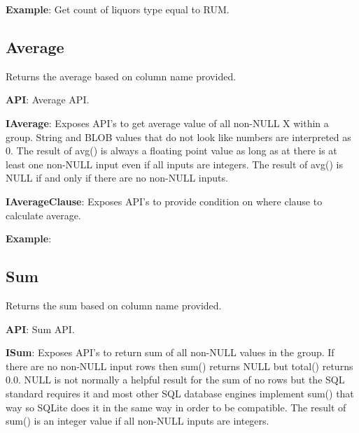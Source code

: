 			\textbf{Example}: Get count of liquors type equal to RUM.
				


	\subsection{Average} 
		\par 
		Returns the average based on column name provided.

			\textbf{API}: Average API.
				
		
			\textbf{IAverage}:  Exposes API's to get average value of all non-NULL X within a group. 
 						 String and BLOB values that do not look like numbers are interpreted as 0.
						 The result of avg() is always a floating point value as long as at there is at least one non-NULL input even if all inputs are integers.
						 The result of avg() is NULL if and only if there are no non-NULL inputs.

				

			
			\textbf{IAverageClause}: Exposes API's to provide condition on where clause to calculate average.
				

			\textbf{Example}: 
				
		

	\subsection{Sum} 
		\par 
		Returns the sum based on column name provided.

			\textbf{API}: Sum API.
				
		
			\textbf{ISum}:   Exposes API's to return sum of all non-NULL values in the group.
					  	 If there are no non-NULL input rows then sum() returns NULL but total() returns 0.0.
						 NULL is not normally a helpful result for the sum of no rows but the SQL standard requires it and most other SQL database engines implement sum() that way so SQLite does it in the same way in order to be compatible.
						 The result of sum() is an integer value if all non-NULL inputs are integers. 

				

